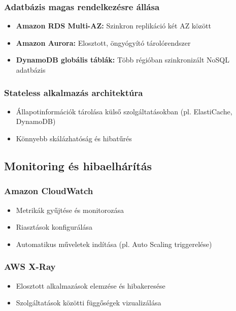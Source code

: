 \documentclass[a4paper,12pt]{article}
\begin{document}
    \subsubsection{Adatbázis magas rendelkezésre állása}

    \begin{itemize}
        \item \textbf{Amazon RDS Multi-AZ:} Szinkron replikáció két AZ között
        \item \textbf{Amazon Aurora:} Elosztott, öngyógyító tárolórendszer
        \item \textbf{DynamoDB globális táblák:} Több régióban szinkronizált NoSQL adatbázis
    \end{itemize}

    \subsubsection{Stateless alkalmazás architektúra}

    \begin{itemize}
        \item Állapotinformációk tárolása külső szolgáltatásokban (pl. ElastiCache, DynamoDB)
        \item Könnyebb skálázhatóság és hibatűrés
    \end{itemize}

    \subsection{Monitoring és hibaelhárítás}

    \subsubsection{Amazon CloudWatch}

    \begin{itemize}
        \item Metrikák gyűjtése és monitorozása
        \item Riasztások konfigurálása
        \item Automatikus műveletek indítása (pl. Auto Scaling triggerelése)
    \end{itemize}

    \subsubsection{AWS X-Ray}

    \begin{itemize}
        \item Elosztott alkalmazások elemzése és hibakeresése
        \item Szolgáltatások közötti függőségek vizualizálása
    \end{itemize}
\end{document}
